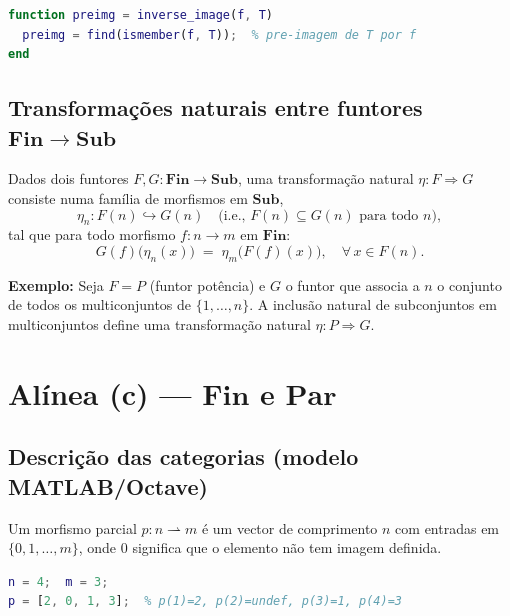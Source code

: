 \documentclass[12pt,a4paper]{article}
\newcommand{\catname}[1]{\mathbf{#1}}
\newcommand{\Fin}{\catname{Fin}}
\newcommand{\Sub}{\catname{Sub}}
\newcommand{\Par}{\catname{Par}}
\newcommand{\parto}{\rightharpoonup}  %
\begin{document}
\begin{lstlisting}[language=Matlab, caption={Funtor contravariante $P^*$ (pré-imagem)}]
function preimg = inverse_image(f, T)
  preimg = find(ismember(f, T));  % pre-imagem de T por f
end
\end{lstlisting}

\subsection{Transformações naturais entre funtores \texorpdfstring{$\Fin \to \Sub$}{Fin -> Sub}}

Dados dois funtores $F, G \colon \Fin \to \Sub$, uma transformação natural $\eta \colon F \Rightarrow G$ consiste numa família de morfismos em $\Sub$,
\[
  \eta_n \colon F(n) \hookrightarrow G(n) \quad \text{(i.e., } F(n) \subseteq G(n) \text{ para todo } n\text{)},
\]
tal que para todo morfismo $f \colon n \to m$ em $\Fin$:
\[
  G(f)\bigl(\eta_n(x)\bigr) \;=\; \eta_m\bigl(F(f)(x)\bigr), \quad \forall\, x \in F(n).
\]

\noindent\textbf{Exemplo:} Seja $F = P$ (funtor potência) e $G$ o funtor que associa a $n$ o conjunto de todos os multiconjuntos de $\{1,\ldots,n\}$. A inclusão natural de subconjuntos em multiconjuntos define uma transformação natural $\eta \colon P \Rightarrow G$.

\section{Alínea (c) --- \texorpdfstring{$\Fin$}{Fin} e \texorpdfstring{$\Par$}{Par}}

\subsection{Descrição das categorias (modelo MATLAB/Octave)}

\begin{defbox}[Categoria $\Par$]
Um morfismo parcial $p \colon n \parto m$ é um vector de comprimento $n$ com entradas em $\{0, 1,\ldots,m\}$, onde $0$ significa que o elemento não tem imagem definida.
\end{defbox}

\begin{lstlisting}[language=Matlab, caption={Morfismo parcial em $\Par$}]
n = 4;  m = 3;
p = [2, 0, 1, 3];  % p(1)=2, p(2)=undef, p(3)=1, p(4)=3
\end{lstlisting}
\end{document}
